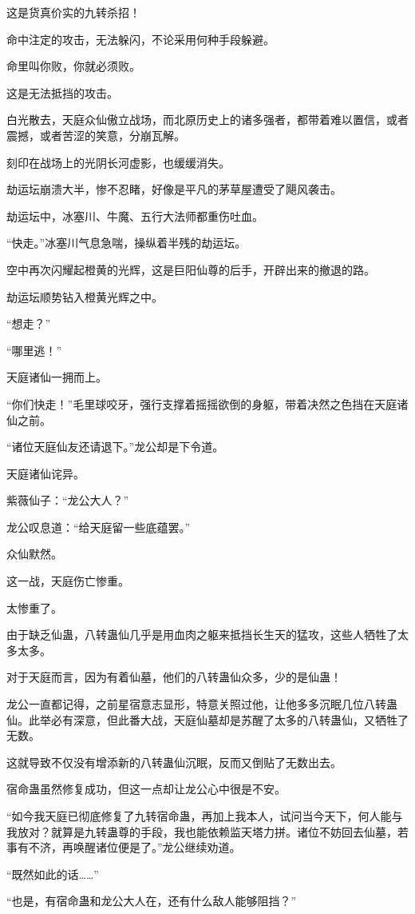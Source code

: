 \begin{this_body}
这是货真价实的九转杀招！

命中注定的攻击，无法躲闪，不论采用何种手段躲避。

命里叫你败，你就必须败。

这是无法抵挡的攻击。

白光散去，天庭众仙傲立战场，而北原历史上的诸多强者，都带着难以置信，或者震撼，或者苦涩的笑意，分崩瓦解。

刻印在战场上的光阴长河虚影，也缓缓消失。

劫运坛崩溃大半，惨不忍睹，好像是平凡的茅草屋遭受了飓风袭击。

劫运坛中，冰塞川、牛魔、五行大法师都重伤吐血。

“快走。”冰塞川气息急喘，操纵着半残的劫运坛。

空中再次闪耀起橙黄的光辉，这是巨阳仙尊的后手，开辟出来的撤退的路。

劫运坛顺势钻入橙黄光辉之中。

“想走？”

“哪里逃！”

天庭诸仙一拥而上。

“你们快走！”毛里球咬牙，强行支撑着摇摇欲倒的身躯，带着决然之色挡在天庭诸仙之前。

“诸位天庭仙友还请退下。”龙公却是下令道。

天庭诸仙诧异。

紫薇仙子：“龙公大人？”

龙公叹息道：“给天庭留一些底蕴罢。”

众仙默然。

这一战，天庭伤亡惨重。

太惨重了。

由于缺乏仙蛊，八转蛊仙几乎是用血肉之躯来抵挡长生天的猛攻，这些人牺牲了太多太多。

对于天庭而言，因为有着仙墓，他们的八转蛊仙众多，少的是仙蛊！

龙公一直都记得，之前星宿意志显形，特意关照过他，让他多多沉眠几位八转蛊仙。此举必有深意，但此番大战，天庭仙墓却是苏醒了太多的八转蛊仙，又牺牲了无数。

这就导致不仅没有增添新的八转蛊仙沉眠，反而又倒贴了无数出去。

宿命蛊虽然修复成功，但这一点却让龙公心中很是不安。

“如今我天庭已彻底修复了九转宿命蛊，再加上我本人，试问当今天下，何人能与我放对？就算是九转蛊尊的手段，我也能依赖监天塔力拼。诸位不妨回去仙墓，若事有不济，再唤醒诸位便是了。”龙公继续劝道。

“既然如此的话……”

“也是，有宿命蛊和龙公大人在，还有什么敌人能够阻挡？”


\end{this_body}
